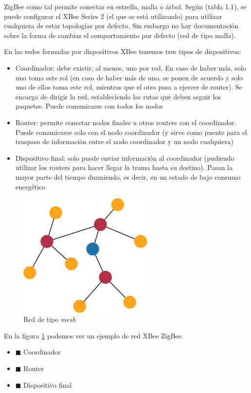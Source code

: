 ZigBee como tal permite conectar en estrella, malla o árbol. Según \cite{faludi} (tabla 1.1), se
puede configurar el XBee Series 2 (el que se está utilizando) para utilizar cualquiera de estar
topologías por defecto. Sin embargo no hay documentación sobre la forma de cambiar el comportamiento
por defecto (red de tipo malla).

En las redes formadas por dispositivos XBee tenemos tres tipos de dispositivos:
\begin{itemize}
  \item Coordinador: debe existir, al menos, uno por red. En caso de haber más, solo uno
  toma este rol (en caso de haber más de uno, se ponen de acuerdo y solo uno de ellos toma
  este rol, mientras que el otro pasa a ejercer de router). Se encarga de dirigir la red,
  estableciendo las rutas que deben seguir los paquetes. Puede comunicarse con todos los nodos
  \item Router: permite conectar nodos finales u otros routers con el coordinador. Puede
  comunicarse solo con el nodo coordinador (y sirve como puente para el traspaso de información
  entre el nodo coordinador y un nodo cualquiera)
  \item Dispositivo final: solo puede enviar información al coordinador (pudiendo utilizar
  los routers para hacer llegar la trama hasta su destino). Pasan la mayor parte del tiempo
  durmiendo, es decir, en un estado de bajo consumo energético
\end{itemize}

\begin{figure}[!htb]
\centering
\includegraphics[width=0.6\textwidth]{./imagenes/mesh}
\caption{Red de tipo \textit{mesh}} \label{fig:mesh}
\end{figure}

En la figura \ref{fig:mesh} podemos ver un ejemplo de red XBee ZigBee.
\begin{itemize}
  \item  \textcolor{blueS}{$\blacksquare$} Coordinador
  \item  \textcolor{rojoOscuroS}{$\blacksquare$} Router
  \item  \textcolor{naranjaS}{$\blacksquare$} Dispositivo final
\end{itemize}


